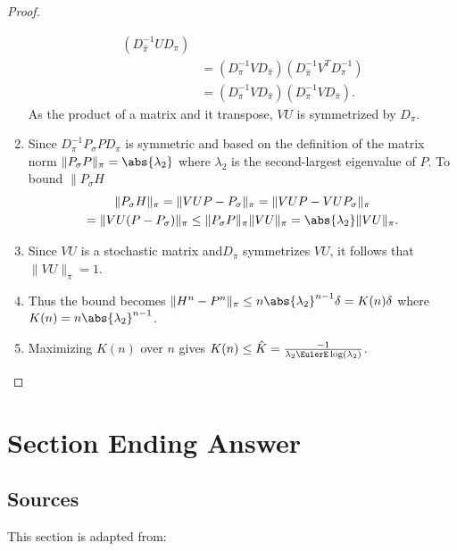 \documentclass[12pt]{article}
\begin{document}
\begin{proof}
\begin{enumerate}
\begin{align*}
                (D_{\hat{\pi}}^{-1} U D_{\pi}) \\
                &= (D_{\pi}^{-1} V D_{\hat{\pi}})(D_{\hat{\pi}}^{-1} V^T
                D_{\pi}^{-1}) \\
                &= (D_{\pi}^{-1} V D_{\hat{\pi}})(D_{\pi}^{-1} V D_{\hat
                {\pi}}).
            \end{align*}
            As the product of a matrix and it transpose, \( VU \) is
            symmetrized by \( D_{\pi} \).
        \item
            Since \( D_{\pi}^{-1} P_{\sigma} P D_{\pi} \) is symmetric
            and based on the definition of the matrix norm \( \| P_{\sigma}
            P \|_{\pi} = \abs{\lambda_2} \) where \( \lambda_2 \) is the
            second-largest eigenvalue of \( P \).  To bound \( \| P_{\sigma}
            H \)
            \begin{multline*}
                \| P_{\sigma} H \|_{\pi} = \| VUP - P_{\sigma} \|_{\pi}
                = \| VUP - VUP_{\sigma}\|_{\pi} \\
                = \| VU(P - P_{\sigma})\|_{\pi} \le \|P_{\sigma} P\|_{\pi}
                \|VU\|_{\pi} = \abs{\lambda_2} \|VU\|_{\pi}.
            \end{multline*}
        \item
            Since \( VU \) is a stochastic matrix and\( D_{\pi} \)
            symmetrizes \( VU \), it follows that \( \| VU \|_{\pi} = 1 \).
        \item
            Thus the bound becomes \( \| H^n - P^n\|_{\pi} \le n \abs{\lambda_2}^
            {n-1} \delta = K(n) \delta \) where \( K(n) = n \abs{\lambda_2}^
            {n-1} \).
        \item
            Maximizing \( K(n) \) over \( n \) gives \( K(n) \le \hat{K}
            = \frac{-1}{\lambda_2 \EulerE \log(\lambda_2)} \).
    \end{enumerate}
\end{proof}

\section*{Section Ending Answer}

\subsection*{Sources} This section is adapted from:
\end{document}
